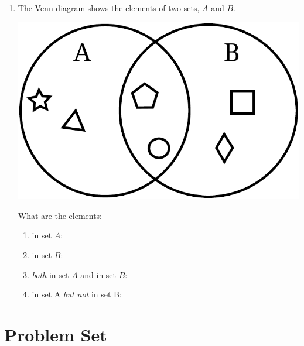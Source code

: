 \documentclass{tufte-book}
\begin{document}
\begin{enumerate}
  \item The Venn diagram shows the elements of two sets, $A$ and $B$.
  \begin{marginfigure}\includegraphics[width=\textwidth]{maths/fig/venn_sets.pdf}\end{marginfigure}
  What are the elements:
  \begin{enumerate}
    \item in set $A$:\dotfill\bigskip
    \item in set $B$:\dotfill\bigskip
    \item \emph{both} in set $A$ and in set $B$:\dotfill\bigskip
    \item in set {A} \emph{but not} in set {B}:\dotfill\bigskip
  \end{enumerate}

\end{enumerate}

\clearpage\section{Problem Set }
\end{document}
